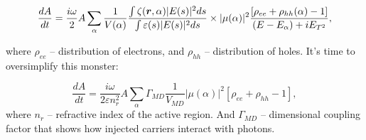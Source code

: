 \begin{equation}
	\frac{d A}{d t} = \frac{i \omega}{2} A \sum_\alpha \frac{1}{V(\alpha)} \frac{\int \zeta(\mbox{\boldmath $r$}, \alpha) |E (s)|^2 ds}{\int \varepsilon(s) |E(s)|^2 d s}
	\times |\mu(\alpha)|^2  \frac{[\rho_{ee} + \rho_{hh}(\alpha) - 1]}{(E-E_\alpha) + i E_{T^2}},
\end{equation}

where $\rho_{ee}$ -- distribution of electrons, and $\rho_{hh}$ -- distribution of holes. It's time to oversimplify  this monster:

\begin{equation}
	\frac{d A}{d t} = \frac{i \omega}{2 \varepsilon n_r^2} A \sum_\alpha \Gamma_{MD} \frac{1}{V_{MD}} |\mu(\alpha)|^2[\rho_{ee} + \rho_{hh} - 1],
\end{equation}
where $n_r$ -- refractive index of the active region.
And $\Gamma_{MD}$ -- dimensional coupling factor that shows how injected carriers interact with photons.